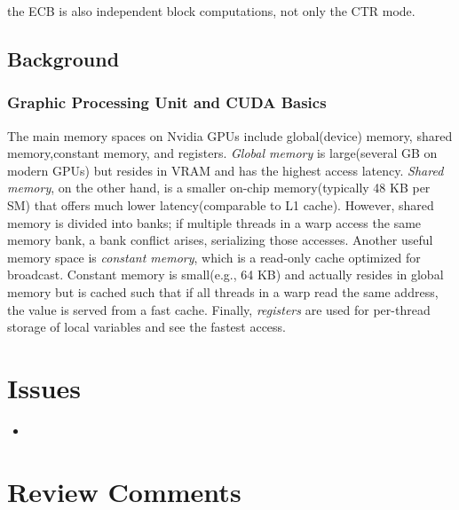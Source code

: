 \documentclass[a4paper]{article}
\begin{document}
\begin{note}
  the ECB is also independent block computations, not only the CTR mode.
\end{note}

\subsection{Background}

\subsubsection{Graphic Processing Unit and CUDA Basics}

The main memory spaces on Nvidia GPUs include global(device) memory, shared memory,constant memory, and registers. \textit{Global memory} is large(several GB on modern GPUs) but resides in VRAM and has the highest access latency. \textit{Shared memory}, on the other hand, is a smaller on-chip memory(typically 48 KB per SM) that offers much lower latency(comparable to L1 cache). However, shared memory is divided into banks; if multiple threads in a warp access the same memory bank, a bank conflict arises, serializing those accesses. Another useful memory space is \textit{constant memory}, which is a read-only cache optimized for broadcast. Constant memory is small(e.g., 64 KB) and actually resides in global memory but is cached such that if all threads in a warp read the same address, the value is served from a fast cache. Finally, \textit{registers} are used for per-thread storage of local variables and see the fastest access.

\section{Issues}

\begin{itemize}
  \item
\end{itemize}

\section{Review Comments}

% 
\end{document}
